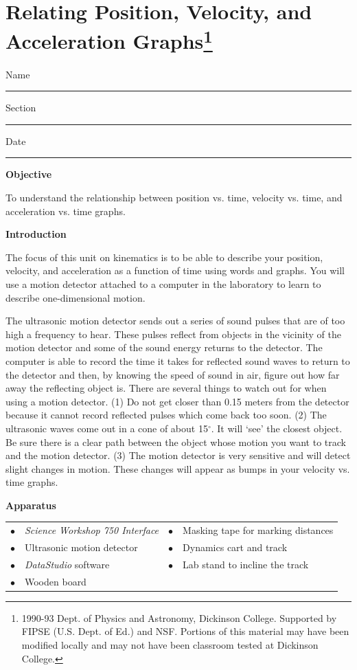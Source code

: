 
\section{Relating Position, Velocity, and Acceleration Graphs\footnote{
1990-93 Dept. of Physics and Astronomy, Dickinson College. Supported by FIPSE
(U.S. Dept. of Ed.) and NSF. Portions of this material may have been modified
locally and may not have been classroom tested at Dickinson College.
}}

Name \rule{2.0in}{0.1pt}\hfill{}Section \rule{1.0in}{0.1pt}\hfill{}Date \rule{1.0in}{0.1pt}

\textbf{Objective }

To understand the relationship between position vs. time, velocity vs. time, and acceleration vs. time
graphs.


\textbf{Introduction} 

The focus of this unit on kinematics is to be able to describe your position, velocity, and acceleration
as a function of time using words and graphs. You will use a motion detector
attached to a computer in the laboratory to learn to describe one-dimensional
motion.

The ultrasonic motion detector sends out a series of sound pulses that are of
too high a frequency to hear. These pulses reflect from objects in the vicinity
of the motion detector and some of the sound energy returns to the detector.
The computer is able to record the time it takes for reflected sound waves to
return to the detector and then, by knowing the speed of sound in air, figure
out how far away the reflecting object is. There are several things to watch
out for when using a motion detector. (1) Do not get closer than 0.15 meters
from the detector because it cannot record reflected pulses which come back
too soon. (2) The ultrasonic waves come out in a cone of about 15\( ^{\circ } \).
It will `see' the closest object. Be sure there is a clear path between the object
whose motion you want to track and the motion detector. (3) The motion detector
is very sensitive and will detect slight changes in motion. 
These changes will appear as bumps in your velocity vs. time graphs.

\vspace{5mm}

\textbf{Apparatus} 

\begin{table}[hbt]
\begin{tabular}{llll}
$\bullet$ & \textit{Science Workshop 750 Interface}  & $\bullet$ & Masking tape for marking distances  \\[3pt]
$\bullet$ & Ultrasonic motion detector               & $\bullet$ & Dynamics cart and track             \\[3pt]
$\bullet$ & \textit{DataStudio} software             & $\bullet$ & Lab stand to incline the track      \\[3pt]
$\bullet$ & Wooden board                             &                                                 \\[3pt]
\end{tabular}
\end{table}

